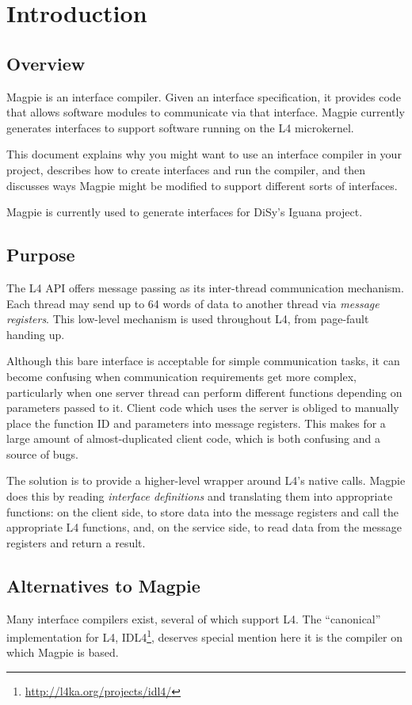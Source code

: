 \chapter{Introduction}

\section{Overview}
Magpie is an interface compiler. Given an interface specification, it provides code that allows software modules to communicate via that interface. Magpie currently generates interfaces to support software running on the L4 microkernel.

This document explains why you might want to use an interface compiler in your project, describes how to create interfaces and run the compiler, and then discusses ways Magpie might be modified to support different sorts of interfaces.

Magpie is currently used to generate interfaces for DiSy's Iguana project.

\section{Purpose}
The L4 API offers message passing as its inter-thread communication mechanism. Each thread may send up to 64 words of data to another thread via {\it message registers}. This low-level mechanism is used throughout L4, from page-fault handing up.

Although this bare interface is acceptable for simple communication tasks, it can become confusing when communication requirements get more complex, particularly when one server thread can perform different functions depending on parameters passed to it. Client code which uses the server is obliged to manually place the function ID and parameters into message registers. This makes for a large amount of almost-duplicated client code, which is both confusing and a source of bugs.

The solution is to provide a higher-level wrapper around L4's native calls. Magpie does this by reading {\it interface definitions} and translating them into appropriate functions: on the client side, to store data into the message registers and call the appropriate L4 functions, and, on the service side, to read data from the message registers and return a result.

\section{Alternatives to Magpie}
Many interface compilers exist, several of which support L4. The ``canonical'' implementation for L4, IDL4\footnote{\url{http://l4ka.org/projects/idl4/}}, deserves special mention here it is the compiler on which Magpie is based.


